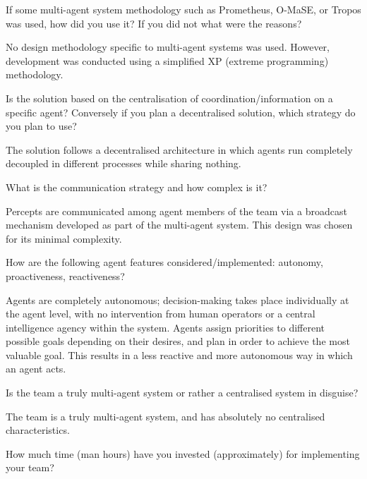 \begin{question}
If some multi-agent system methodology such
as Prometheus, O-MaSE, or Tropos was used, how did you use it? If you did not
what were the reasons?  
\end{question}

No design methodology specific to multi-agent systems
was used. However, development was conducted using a simplified XP (extreme
programming) methodology. 

\begin{question}
Is the solution based on the centralisation of coordination/information on
a specific agent? Conversely if you plan a decentralised solution, which
strategy do you plan to use?  
\end{question}

The solution follows a decentralised
architecture in which agents run completely decoupled in different processes
while sharing nothing.

\begin{question}
What is the communication strategy and how complex is it?  
\end{question}

Percepts are
communicated among agent members of the team via a broadcast mechanism
developed as part of the multi-agent system. This design was chosen for its
minimal complexity.

\begin{question}
How are the following agent features considered/implemented: autonomy,
proactiveness, reactiveness?  
\end{question}

Agents are completely autonomous;
decision-making takes place individually at the agent level, with no
intervention from human operators or a central intelligence agency within the
system.  Agents assign priorities to different possible goals depending on
their desires, and plan in order to achieve the most valuable goal. This
results in a less reactive and more autonomous way in which an agent acts.

\begin{question}
Is the team a truly multi-agent system or rather a centralised system in
disguise?  
\end{question}

The team is a truly multi-agent system, and has absolutely no
centralised characteristics.

\begin{question}
How much time (man hours) have you invested (approximately) for
implementing your team?  
\end{question}

